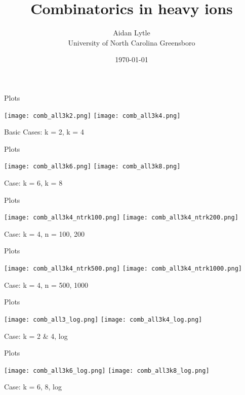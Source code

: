 \documentclass[aspectratio=169,compress,10pt]{beamer} %
\title[\today~-~Slide \insertframenumber]{Combinatorics in heavy ions}
\author[UNCG]{Aidan Lytle \\ University of North Carolina Greensboro}
\date{\today}
\begin{document}
\begin{frame}
\titlepage
\end{frame}





\begin{frame}{Plots}
\begin{adjustwidth}{-2em}{-2em}
\texttt{[image: comb\_all3k2.png]}
\texttt{[image: comb\_all3k4.png]}
\caption{Basic Cases: k = 2, k = 4}
\end{adjustwidth}
\end{frame}

\begin{frame}{Plots}
\begin{adjustwidth}{-2em}{-2em}
\texttt{[image: comb\_all3k6.png]}
\texttt{[image: comb\_all3k8.png]}
\caption{Case: k = 6, k = 8}
\end{adjustwidth}
\end{frame}

\begin{frame}{Plots}
\begin{adjustwidth}{-2em}{-2em}
\texttt{[image: comb\_all3k4\_ntrk100.png]}
\texttt{[image: comb\_all3k4\_ntrk200.png]}
\caption{Case: k = 4, n = 100, 200}
\end{adjustwidth}
\end{frame}

\begin{frame}{Plots}
\begin{adjustwidth}{-2em}{-2em}
\texttt{[image: comb\_all3k4\_ntrk500.png]}
\texttt{[image: comb\_all3k4\_ntrk1000.png]}
\caption{Case: k = 4, n = 500, 1000}
\end{adjustwidth}
\end{frame}

\begin{frame}{Plots}
\begin{adjustwidth}{-2em}{-2em}
\texttt{[image: comb\_all3\_log.png]}
\texttt{[image: comb\_all3k4\_log.png]}
\caption{Case: k = 2 & 4, log}
\end{adjustwidth}
\end{frame}

\begin{frame}{Plots}
\begin{adjustwidth}{-2em}{-2em}
\texttt{[image: comb\_all3k6\_log.png]}
\texttt{[image: comb\_all3k8\_log.png]}
\caption{Case: k = 6, 8, log}
\end{adjustwidth}
\end{frame}
\end{document}
